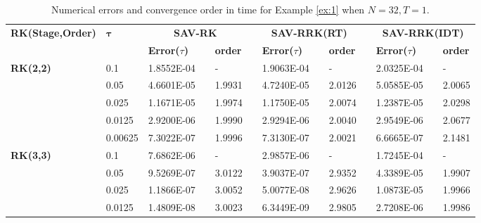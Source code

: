 \documentclass[preprint,compress,3p,10pt,fleqn]{elsarticle}
\numberwithin{equation}{section}
\begin{document}
\begin{table}[H]\footnotesize
\centering
\caption{Numerical errors and convergence order in time for Example \ref{ex:1} when $N=32, T = 1$.}
\begin{tabular}{lllllrlrlrlrlrl}
\toprule
\multicolumn{2}{l}{\multirow{2}[3]{*}{\textbf{RK(Stage,Order)}}} & \multicolumn{2}{l}{\multirow{2}[3]{*}{$\bm{\tau}$}} & \multicolumn{3}{c}{\textbf{SAV-RK}} &       & \multicolumn{3}{c}{\textbf{SAV-RRK(RT)}} &       & \multicolumn{3}{c}{\textbf{SAV-RRK(IDT)}} \\
\cmidrule{5-7}\cmidrule{9-11}\cmidrule{13-15}    \multicolumn{2}{l}{} & \multicolumn{2}{l}{} & \textbf{Error($\tau$)} &       & \textbf{order} &       & \textbf{Error($\tau$)} &       & \textbf{order} &       & \textbf{Error($\tau$)} &       & \textbf{order} \\
\hline
\multicolumn{2}{l}{\multirow{5}[0]{*}{\textbf{RK(2,2)}}} & \multicolumn{2}{l}{0.1} & 1.8552E-04 &       & -     &       & 1.9063E-04 &       & -     &       & 2.0325E-04 &       & - \\
\multicolumn{2}{l}{} & \multicolumn{2}{l}{0.05} & 4.6601E-05 &       & 1.9931  &       & 4.7240E-05 &       & 2.0126  &       & 5.0585E-05 &       & 2.0065  \\
\multicolumn{2}{l}{} & \multicolumn{2}{l}{0.025} & 1.1671E-05 &       & 1.9974  &       & 1.1750E-05 &       & 2.0074  &       & 1.2387E-05 &       & 2.0298  \\
\multicolumn{2}{l}{} & \multicolumn{2}{l}{0.0125} & 2.9200E-06 &       & 1.9990  &       & 2.9294E-06 &       & 2.0040  &       & 2.9549E-06 &       & 2.0677  \\
\multicolumn{2}{l}{} & \multicolumn{2}{l}{0.00625} & 7.3022E-07 &       & 1.9996  &       & 7.3130E-07 &       & 2.0021  &       & 6.6665E-07 &       & 2.1481  \\
\multicolumn{2}{l}{\multirow{5}[0]{*}{\textbf{RK(3,3)}}} & \multicolumn{2}{l}{0.1} & 7.6862E-06 &       & -     &       & 2.9857E-06 &       & -     &       & 1.7245E-04 &       & - \\
\multicolumn{2}{l}{} & \multicolumn{2}{l}{0.05} & 9.5269E-07 &       & 3.0122  &       & 3.9037E-07 &       & 2.9352  &       & 4.3389E-05 &       & 1.9907  \\
\multicolumn{2}{l}{} & \multicolumn{2}{l}{0.025} & 1.1866E-07 &       & 3.0052  &       & 5.0077E-08 &       & 2.9626  &       & 1.0873E-05 &       & 1.9966  \\
\multicolumn{2}{l}{} & \multicolumn{2}{l}{0.0125} & 1.4809E-08 &       & 3.0023  &       & 6.3449E-09 &       & 2.9805  &       & 2.7208E-06 &       & 1.9986  \\

\end{tabular}
\end{table}
\end{document}
